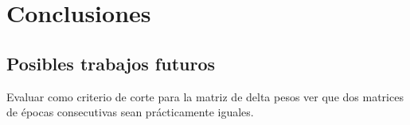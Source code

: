 \documentclass[informe.tex]{subfiles}
\begin{document}
  
  \section{Conclusiones}

  
    \subsection{Posibles trabajos futuros}
    
      Evaluar como criterio de corte para la matriz de delta pesos ver que dos matrices de épocas consecutivas sean prácticamente iguales.
\end{document}

